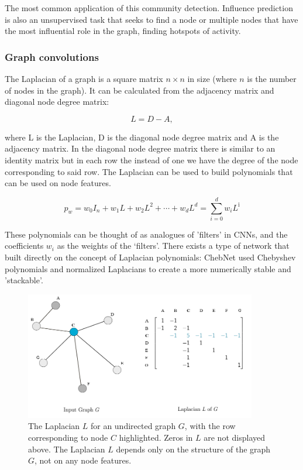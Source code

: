 	The most common application of this community detection\cite{bruna2017community}. Influence prediction is also an unsupervised task that seeks to find a node or multiple nodes that have the most influential role in the graph, finding hotspots of activity\cite{cao2020popularity}. 
	
	\subsubsection{Graph convolutions}
	
	The Laplacian of a graph is a square matrix $n \times n$ in size (where $n$ is the number of nodes in the graph). It can be calculated from the adjacency matrix and diagonal node degree matrix:
	
	$$ L = D - A, $$
	
	where L is the Laplacian, D is the diagonal node degree matrix and A is the adjacency matrix. In the diagonal node degree matrix there is similar to an identity matrix but in each row the instead of one we have the degree of the node corresponding to said row. The Laplacian can be used to build polynomials that can be used on node features\cite{daigavane2021understanding}.
	
	$$ p_w = w_0 I_n + w_1 L + w_2 L^2 + \cdots + w_d L^d = \sum_{i=0}^{d} w_i L^î $$
	
	These polynomials can be thought of as analogues of 'filters' in CNNs, and the coefficients $w_i$ as the weights of the ‘filters’. There exists a type of network that built directly on the concept of Laplacian polynomials: ChebNet\cite{defferrard2016convolutional} used Chebyshev polynomials and normalized Laplacians to create a more numerically stable and 'stackable'.
	
	\begin{figure}[!h]
		\centering
		\includegraphics[width=0.9\textwidth]{figures/Laplacian.png}
		\caption{The Laplacian $L$ for an undirected graph $G$, with the row corresponding to node $C$ highlighted. Zeros in $L$ are not displayed above. The Laplacian $L$ depends only on the structure of the graph $G$, not on any node features. \cite{daigavane2021understanding}}
	\end{figure}
	
